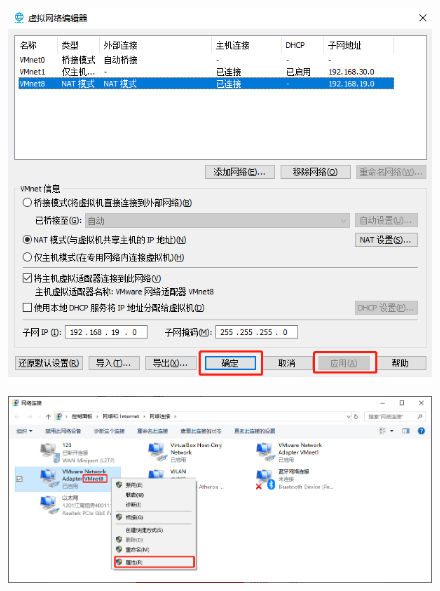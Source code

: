 \documentclass[12pt, openany, oneside]{book}
\begin{document}
\begin{figure}[H]
    \centering
    \includegraphics[scale=0.6]{img/Chapter1/1-4/7.png}
\end{figure}

\begin{figure}[H]
    \centering
    \includegraphics[scale=0.4]{img/Chapter1/1-4/8.png}
\end{figure}
\end{document}
